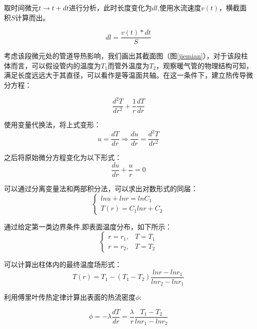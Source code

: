 \documentclass{my_paper}
\begin{document}
取时间微元$ t\to t+dt $进行分析，此时长度变化为$dl$,使用水流速度$v(t)$，横截面积$S$计算而出。

\begin{equation}
    dl = \frac{v(t)*dt}{S}
\end{equation}

考虑该段微元处的管道导热影响，我们画出其截面图（图\ref{jiemian}），对于该段柱体而言，可以假设管内的温度为$T_1$而管外温度为$T_2$，观察暖气管的物理结构可知，满足长度远远大于其直径，可以看作是等温面共轴。在这一条件下，建立热传导微分方程：

\begin{equation}
\frac{d^{2}T}{dr^{2}} + \frac{1}{r}\frac{dT}{dr}
\end{equation}

使用变量代换法，将上式变形：
\begin{equation}
u = \frac{dT}{dr} \Rightarrow  \frac{du}{dr}=\frac{d^2T}{dr^2}
\label{}
\end{equation}

之后将原始微分方程变化为以下形式：
\begin{equation}
\frac{du}{dr}+\frac{u}{r} = 0
\label{}
\end{equation}

可以通过分离变量法和两部积分法，可以求出对数形式的同届：
\begin{equation}
    \begin{cases}
        ln u +lnr = lnC_1\\
        T(r) = C_1 lnr + C_2
    \end{cases}
\label{}
\end{equation}

通过给定第一类边界条件\cite{1},即表面温度分布，如下所示：
\begin{equation}
    \begin{cases}
        r = r_1 , & T = T_1\\
        r = r_2 , & T = T_2
    \end{cases}
\end{equation}

可以计算出柱体内的最终温度场形式：
\begin{equation}
    T(r) = T_1 - (T_1-T_2)\frac{lnr - lnr_1}{lnr_2 - lnr_1}
\end{equation}

利用傅里叶传热定律计算出表面的热流密度$\phi$:

\begin{equation}
    \phi = -\lambda \frac{dT}{dr} = \frac{\lambda}{r}\frac{T_1-T_2}{lnr_1-lnr_2}
\end{equation}
\end{document}
